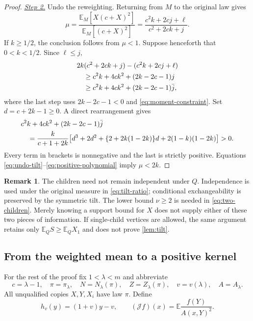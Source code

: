 \documentclass[11pt,a4paper]{article}
\numberwithin{equation}{section}
\theoremstyle{notethm}
\theoremstyle{definition}
\newtheorem{remark}[remark]{Remark}
\newcommand{\E}{\mathbb E}
\newcommand{\cJ}{\mathcal J}
\begin{document}
\begin{proof}
\smallskip\noindent
\underline{\textit{Step 2.}} Undo the reweighting.
Returning from $M$ to the original law gives
\begin{equation}\label{eq:undo-tilt}
 \mu=
 \frac{\E_M[X(c+X)^2]}{\E_M[(c+X)^2]}
 =\frac{c^2k+2cj+\ell}{c^2+2ck+j}.
\end{equation}
If $k\ge1/2$, the conclusion follows from $\mu<1$. Suppose henceforth that
$0<k<1/2$. Since $\ell\le j$,
\begin{align}
 &2k(c^2+2ck+j)-(c^2k+2cj+\ell)\notag\\
 &\hspace{1em}\ge c^2k+4ck^2+(2k-2c-1)j\notag\\
 &\hspace{1em}\ge c^2k+4ck^2+(2k-2c-1)\bar j,
 \label{eq:gap-bound}
\end{align}
where the last step uses $2k-2c-1<0$ and \eqref{eq:moment-constraint}.
Set $d=c+2k-1\ge0$. A direct rearrangement gives
\begin{align}
 &c^2k+4ck^2+(2k-2c-1)\bar j\notag\\
 &\quad=\frac{k}{c+1+2k}\bigl[
 d^3+2d^2+\{2+2k(1-2k)\}d
                  +2(1-k)(1-2k)\bigr]>0.
 \label{eq:positive-polynomial}
\end{align}
Every term in brackets is nonnegative and the last is strictly positive.
Equations \eqref{eq:undo-tilt}--\eqref{eq:positive-polynomial} imply $\mu<2k$.
\end{proof}

\begin{remark}\label{rem:why-two}
The children need not remain independent under $Q$. Independence is used
under the original measure in \eqref{eq:tilt-ratio}; conditional exchangeability
is preserved by the symmetric tilt. The lower bound
$\nu\ge2$ is needed in \eqref{eq:two-children}. Merely knowing a support bound
for $X$ does not supply either of these two pieces of information. If
single-child vertices are allowed, the same argument retains only
$\E_QS\ge \E_QX_1$ and does not prove \cref{lem:tilt}.
\end{remark}

\subsection{From the weighted mean to a positive kernel}\label{sec:kernel}

For the rest of the proof fix $1<\lambda<m$ and abbreviate
\begin{equation}\label{eq:basepoint}
 c=\lambda-1,\quad \pi=\pi_\lambda,\quad
 N=N_\lambda(\pi),\quad Z=Z_\lambda(\pi),\quad v=v(\lambda),
 \quad A=A_\lambda.
\end{equation}
All unqualified copies $X,Y,X_i$ have law $\pi$. Define
\begin{equation}\label{eq:J-h}
 h_v(y)=(1+v)y-v,
 \qquad
 (\cJ f)(x)=\E\frac{f(Y)}{A(x,Y)^2}.
\end{equation}
\end{document}
